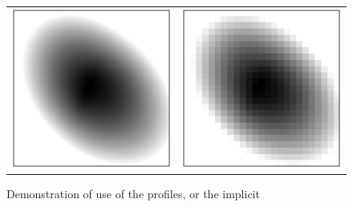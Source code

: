 \documentclass[12pt,pdftex,preprint]{aastex}
\newlength{\figurewidth}
\begin{document}
\begin{figure}
\begin{tabular}{@{}c@{}c@{}}
\includegraphics[width=\figurewidth]{trdemo-08} &
\includegraphics[width=\figurewidth]{trdemo-09}
\end{tabular}
\caption{Demonstration of use of the profiles, or the implicit
}
\end{figure}
\end{document}
